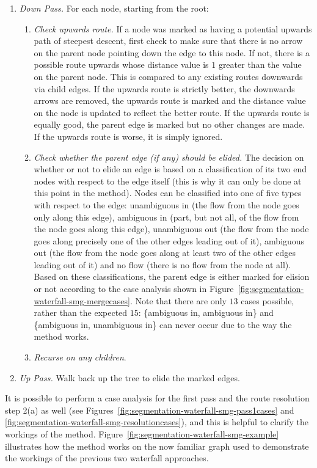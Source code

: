 \documentclass[a4paper]{article}
\begin{document}
\begin{enumerate}
\item \emph{Down Pass.} For each node, starting from the root:

\begin{enumerate}
\item \emph{Check upwards route.} If a node was marked as having a potential upwards path of steepest descent, first check to make sure that there is no arrow on the parent node pointing down the edge to this node. If not, there is a possible route upwards whose distance value is $1$ greater than the value on the parent node. This is compared to any existing routes downwards via child edges. If the upwards route is strictly better, the downwards arrows are removed, the upwards route is marked and the distance value on the node is updated to reflect the better route. If the upwards route is equally good, the parent edge is marked but no other changes are made. If the upwards route is worse, it is simply ignored.
\item \emph{Check whether the parent edge (if any) should be elided.} The decision on whether or not to elide an edge is based on a classification of its two end nodes with respect to the edge itself (this is why it can only be done at this point in the method). Nodes can be classified into one of five types with respect to the edge: unambiguous in (the flow from the node goes only along this edge), ambiguous in (part, but not all, of the flow from the node goes along this edge), unambiguous out (the flow from the node goes along precisely one of the other edges leading out of it), ambiguous out (the flow from the node goes along at least two of the other edges leading out of it) and no flow (there is no flow from the node at all). Based on these classifications, the parent edge is either marked for elision or not according to the case analysis shown in Figure~\ref{fig:segmentation-waterfall-smg-mergecases}. Note that there are only $13$ cases possible, rather than the expected $15$: \{ambiguous in, ambiguous in\} and \{ambiguous in, unambiguous in\} can never occur due to the way the method works.
\item \emph{Recurse on any children}.
\end{enumerate}

\item \emph{Up Pass.} Walk back up the tree to elide the marked edges.

\end{enumerate}

\noindent It is possible to perform a case analysis for the first pass and the route resolution step 2(a) as well (see Figures~\ref{fig:segmentation-waterfall-smg-pass1cases} and \ref{fig:segmentation-waterfall-smg-resolutioncases}), and this is helpful to clarify the workings of the method. Figure~\ref{fig:segmentation-waterfall-smg-example} illustrates how the method works on the now familiar graph used to demonstrate the workings of the previous two waterfall approaches.
\end{document}
